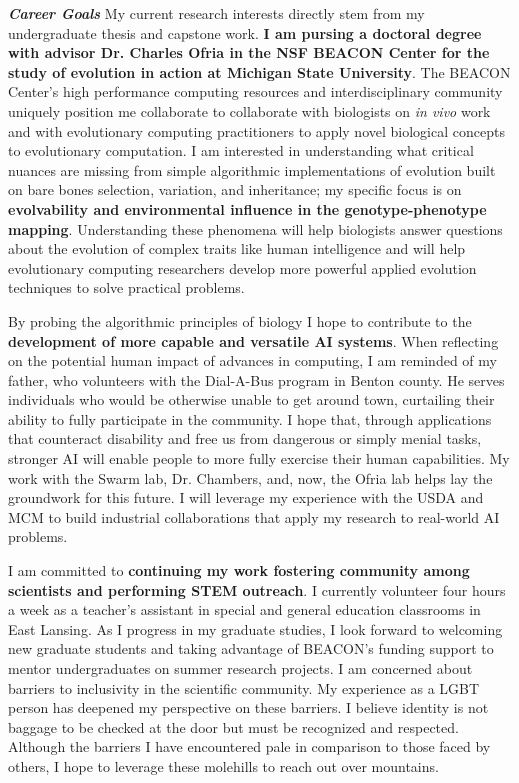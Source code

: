 \textit{\textbf{Career Goals}}
My current research interests directly stem from my undergraduate thesis and capstone work.
\textbf{I am pursing a doctoral degree with advisor Dr. Charles Ofria in the NSF BEACON Center for the study of evolution in action at Michigan State University}.
The BEACON Center's high performance computing resources and interdisciplinary community uniquely position me collaborate to collaborate with biologists on \textit{in vivo} work and with evolutionary computing practitioners to apply novel biological concepts to evolutionary computation.
I am interested in understanding what critical nuances are missing from simple algorithmic implementations of evolution built on bare bones selection, variation, and inheritance;
my specific focus is on \textbf{evolvability and environmental influence in the genotype-phenotype mapping}.
Understanding these phenomena will help biologists answer questions about the evolution of complex traits like human intelligence and will help evolutionary computing researchers develop more powerful applied evolution techniques to solve practical problems.

By probing the algorithmic principles of biology I hope to contribute to the \textbf{development of more capable and versatile AI systems}.
When reflecting on the potential human impact of advances in computing, I am reminded of my father, who volunteers with the Dial-A-Bus program in Benton county.
He serves individuals who would be otherwise unable to get around town, curtailing their ability to fully participate in the community.
I hope that, through applications that counteract disability and free us from dangerous or simply menial tasks, stronger AI will enable people to more fully exercise their human capabilities.
My work with the Swarm lab, Dr. Chambers, and, now, the Ofria lab helps lay the groundwork for this future.
I will leverage my experience with the USDA and MCM to build industrial collaborations that apply my research to real-world AI problems.

I am committed to \textbf{continuing my work fostering community among scientists and performing STEM outreach}.
I currently volunteer four hours a week as a teacher's assistant in special and general education classrooms in East Lansing.
As I progress in my graduate studies, I look forward to welcoming new graduate students and taking advantage of BEACON's funding support to mentor undergraduates on summer research projects.
I am concerned about barriers to inclusivity in the scientific community.
My experience as a LGBT person has deepened my perspective on these barriers.
I believe identity is not baggage to be checked at the door but must be recognized and respected.
Although the barriers I have encountered pale in comparison to those faced by others, I hope to leverage these molehills to reach out over mountains.

